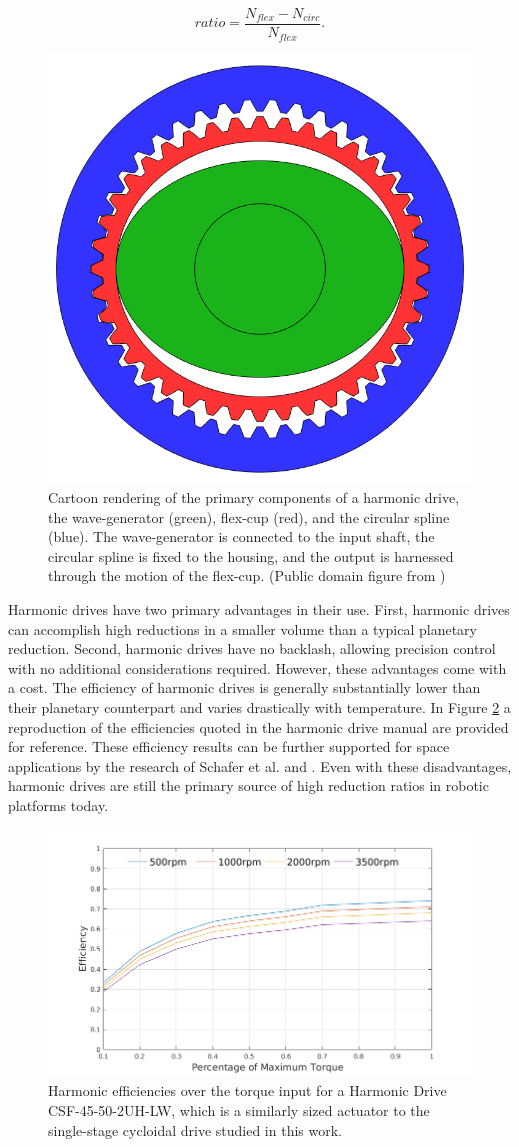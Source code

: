 \begin{equation} \label{eq:harmonic_ratio}
ratio = \frac{N_{flex} - N_{circ}} {N_{flex}}.
\end{equation}

\begin{figure}[t]
   \centering
   \includegraphics[width=0.3\linewidth]{fig/harmonic_blank}
   \caption{Cartoon rendering of the primary components of a harmonic drive, the wave-generator (green), flex-cup (red), and the circular spline (blue). The wave-generator is connected to the input shaft, the circular spline is fixed to the housing, and the output is harnessed through the motion of the flex-cup. (Public domain figure from \cite{ref:harmonic_cartoon})}
   \label{fig:harmonic_cartoon}
\end{figure}

Harmonic drives have two primary advantages in their use. First, harmonic drives can accomplish high reductions in a smaller volume than a typical planetary reduction. Second, harmonic drives have no backlash, allowing precision control with no additional considerations required. However, these advantages come with a cost. The efficiency of harmonic drives is generally substantially lower than their planetary counterpart and varies drastically with temperature. In Figure \ref{fig:harmonic_eff} a reproduction of the efficiencies quoted in the harmonic drive manual \cite{ref:harmonic_sheet} are provided for reference. These efficiency results can be further supported for space applications by the research of Schafer et al. \cite{ref:harmonic_space_lube} and \cite{ref:harmonic_performance}. Even with these disadvantages, harmonic drives are still the primary source of high reduction ratios in robotic platforms today. 

\begin{figure}[t]
   \centering
   \includegraphics[width=0.9\linewidth]{fig/harmonic_eff}
   \caption{Harmonic efficiencies over the torque input for a Harmonic Drive CSF-45-50-2UH-LW, which is a similarly sized actuator to the single-stage cycloidal drive studied in this work.}
   \label{fig:harmonic_eff}
\end{figure}

